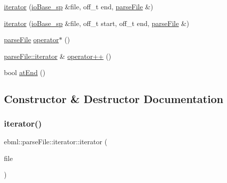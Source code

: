 \begin{DoxyCompactItemize}
\item 
\mbox{\hyperlink{classebml_1_1parseFile_1_1iterator_ae86d31d363e514e1d84ddbe30db8e646}{iterator}} (\mbox{\hyperlink{namespaceebml_a7bb59128ac6af27e47367938a846b569}{io\+Base\+\_\+sp}} \&file, off\+\_\+t end, \mbox{\hyperlink{classebml_1_1parseFile}{parse\+File}} \&)
\item 
\mbox{\hyperlink{classebml_1_1parseFile_1_1iterator_aa04539e6df922f32dbd7025288675fe7}{iterator}} (\mbox{\hyperlink{namespaceebml_a7bb59128ac6af27e47367938a846b569}{io\+Base\+\_\+sp}} \&file, off\+\_\+t start, off\+\_\+t end, \mbox{\hyperlink{classebml_1_1parseFile}{parse\+File}} \&)
\item 
\mbox{\hyperlink{classebml_1_1parseFile}{parse\+File}} \mbox{\hyperlink{classebml_1_1parseFile_1_1iterator_a42ff918ed6e91d7f7acfa53a7b36b771}{operator$\ast$}} ()
\item 
\mbox{\hyperlink{classebml_1_1parseFile_1_1iterator}{parse\+File\+::iterator}} \& \mbox{\hyperlink{classebml_1_1parseFile_1_1iterator_aa96daedba0d43670d9760777c0fd8916}{operator++}} ()
\item 
bool \mbox{\hyperlink{classebml_1_1parseFile_1_1iterator_a268793b0f909717f1e284c20d2804ec4}{at\+End}} ()
\end{DoxyCompactItemize}


\subsection{Constructor \& Destructor Documentation}
\mbox{\label{classebml_1_1parseFile_1_1iterator_ab2f11b4ec9f9a3a4a075d294821cf06e}} 
\subsubsection{\texorpdfstring{iterator()}{iterator()}\hspace{0.1cm}{\footnotesize\ttfamily [1/10]}}
{\footnotesize\ttfamily ebml\+::parse\+File\+::iterator\+::iterator (\begin{DoxyParamCaption}\item[{\mbox{\hyperlink{classebml_1_1ioBase}{io\+Base}} $\ast$}]{file }\end{DoxyParamCaption})}

\mbox{\label{classebml_1_1parseFile_1_1iterator_a8d3db3fee812b47a91982c61f0cc640f}} 
